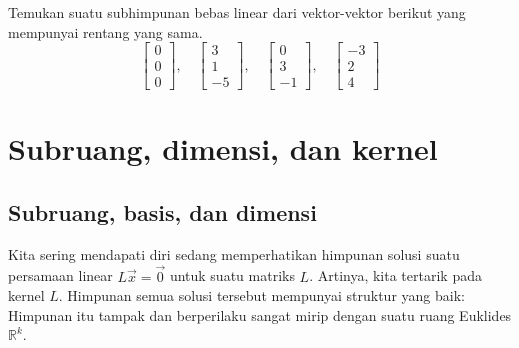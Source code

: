 \begin{exercise}
Temukan suatu subhimpunan bebas linear dari vektor-vektor berikut yang mempunyai
rentang yang sama.
\begin{equation*}
\begin{bmatrix}
0 \\ 0 \\ 0
\end{bmatrix}
, \quad
\begin{bmatrix}
3 \\ 1 \\ -5
\end{bmatrix}
, \quad
\begin{bmatrix}
0 \\ 3 \\ -1
\end{bmatrix}
, \quad
\begin{bmatrix}
-3 \\ 2 \\ 4
\end{bmatrix}
\end{equation*}
\end{exercise}




\sectionnewpage
\section{Subruang, dimensi, dan kernel}
\label{subspaces:section}



\subsection{Subruang, basis, dan dimensi}

Kita sering mendapati diri sedang memperhatikan himpunan
solusi suatu persamaan linear $L\vec{x} = \vec{0}$ untuk suatu matriks $L$.
Artinya, kita tertarik pada kernel $L$.
Himpunan semua solusi tersebut mempunyai struktur yang baik: Himpunan itu tampak dan
berperilaku sangat mirip dengan suatu ruang Euklides ${\mathbb R}^k$.

